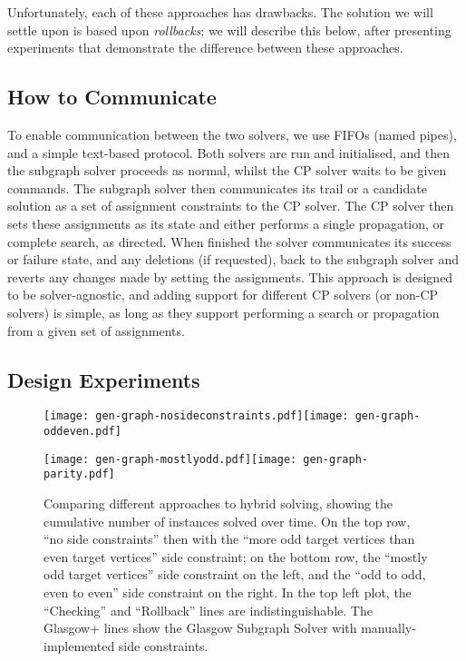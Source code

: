 \documentclass[runningheads]{llncs}
\begin{document}
Unfortunately, each of these approaches has drawbacks. The solution we will settle upon is based
upon \emph{rollbacks}; we will describe this below, after presenting experiments that demonstrate
the difference between these approaches.

\subsection{How to Communicate}

To enable communication between the two solvers, we use FIFOs (named pipes), and a simple text-based
protocol.  Both solvers are run and initialised, and then the subgraph solver proceeds as normal,
whilst the CP solver waits to be given commands. The subgraph solver then communicates its trail or
a candidate solution as a set of assignment constraints to the CP solver. The CP solver then sets
these assignments as its state and either performs a single propagation, or complete search, as
directed. When finished the solver communicates its success or failure state, and any deletions (if
requested), back to the subgraph solver and reverts any changes made by setting the assignments.
This approach is designed to be solver-agnostic, and adding support for different CP solvers (or
non-CP solvers) is simple, as long as they support performing a search or propagation from a given
set of assignments.

\subsection{Design Experiments}

\begin{figure}[p]
    \texttt{[image: gen-graph-nosideconstraints.pdf]}\hfill\texttt{[image: gen-graph-oddeven.pdf]}

    \bigskip

    \texttt{[image: gen-graph-mostlyodd.pdf]}\hfill\texttt{[image: gen-graph-parity.pdf]}
    \caption{Comparing different approaches to hybrid solving, showing the cumulative number of
    instances solved over time. On the top row, ``no side constraints'' then with the ``more odd
    target vertices than even target vertices'' side constraint; on the bottom row, the ``mostly odd
    target vertices'' side constraint on the left, and the ``odd to odd, even to even'' side
    constraint on the right. In the top left plot, the ``Checking'' and ``Rollback'' lines are
    indistinguishable. The Glasgow+ lines show the Glasgow Subgraph Solver with
    manually-implemented side constraints.}\label{figure:cumulative}
\end{figure}
\end{document}
